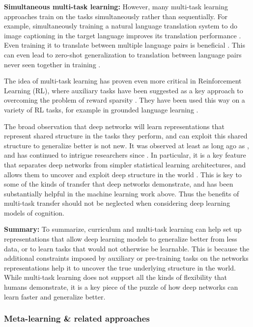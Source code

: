 \documentclass[11pt]{article}
\begin{document}
\textbf{Simultaneous multi-task learning:} However, many multi-task learning approaches train on the tasks simultaneously rather than sequentially. For example, simultaneously training a natural language translation system to do image captioning in the target language improves its translation performance \citep{Luong2016}. Even training it to translate between multiple language pairs is beneficial \citep{Dong2015}. This can even lead to zero-shot generalization to translation between language pairs never seen together in training \citep{Johnson2016a}. \par 
The idea of multi-task learning has proven even more critical in Reinforcement Learning (RL), where auxiliary tasks have been suggested as a key approach to overcoming the problem of reward sparsity \citep[e.g.]{LeCun2016}. They have been used this way on a variety of RL tasks, for example in grounded language learning \citep{Hermann2017}. \par
The broad observation that deep networks will learn representations that represent shared structure in the tasks they perform, and can exploit this shared structure to generalize better is not new. It was observed at least as long ago as \citet{Hinton1986}, and has continued to intrigue researchers since \citep[e.g.]{Lampinen2017a}. In particular, it is a key feature that separates deep networks from simpler statistical learning architectures, and allows them to uncover and exploit deep structure in the world \citep{Rogers2008}. This is key to some of the kinds of transfer that deep networks demonstrate, and has been substantially helpful in the machine learning work above. Thus the benefits of multi-task transfer should not be neglected when considering deep learning models of cognition. \par 

\textbf{Summary:} To summarize, curriculum and multi-task learning can help set up representations that allow deep learning models to generalize better from less data, or to learn tasks that would not otherwise be learnable. This is because the additional constraints imposed by auxiliary or pre-training tasks on the networks representations help it to uncover the true underlying structure in the world. While multi-task learning does not support all the kinds of flexibility that humans demonstrate, it is a key piece of the puzzle of how deep networks can learn faster and generalize better. \par

\subsubsection{Meta-learning \& related approaches}
\end{document}
